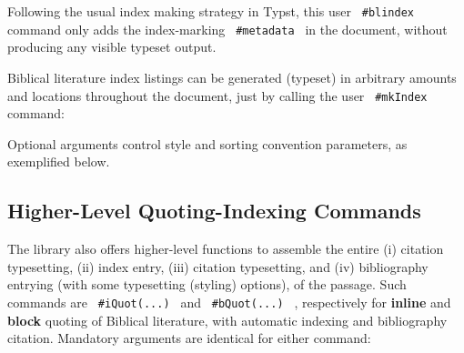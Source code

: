 \begin{Shaded}
\begin{Highlighting}[]
\end{Highlighting}
\end{Shaded}

Following the usual index making strategy in Typst, this user
\texttt{\ \#blindex\ } command only adds the index-marking
\texttt{\ \#metadata\ } in the document, without producing any visible
typeset output.

Biblical literature index listings can be generated (typeset) in
arbitrary amounts and locations throughout the document, just by calling
the user \texttt{\ \#mkIndex\ } command:

\begin{Shaded}
\begin{Highlighting}[]
\end{Highlighting}
\end{Shaded}

Optional arguments control style and sorting convention parameters, as
exemplified below.

\subsection{Higher-Level Quoting-Indexing
Commands}\label{higher-level-quoting-indexing-commands}

The library also offers higher-level functions to assemble the entire
(i) citation typesetting, (ii) index entry, (iii) citation typesetting,
and (iv) bibliography entrying (with some typesetting (styling)
options), of the passage. Such commands are \texttt{\ \#iQuot(...)\ }
and \texttt{\ \#bQuot(...)\ } , respectively for \textbf{inline} and
\textbf{block} quoting of Biblical literature, with automatic indexing
and bibliography citation. Mandatory arguments are identical for either
command:

\begin{Shaded}
\begin{Highlighting}[]

\end{Highlighting}
\end{Shaded}

